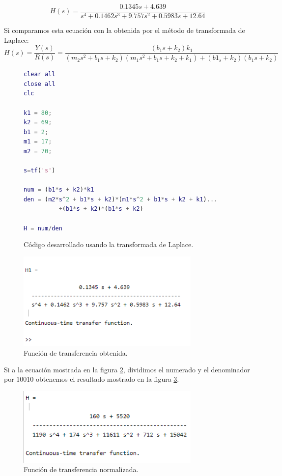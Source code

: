 \documentclass{article}
\begin{document}
\begin{enumerate}
\begin{equation*}
  H(s) = \frac{0.1345s + 4.639}{s^4+0.1462s^3+9.757s^2+0.5983s+12.64} 
\end{equation*}

Si comparamos esta ecuación con la obtenida por el método de transformada de Laplace:
\begin{equation*}
  H(s) = \frac{Y(s)}{R(s)} = \frac{(b_1s+k_2)k_1}{(m_2s^2+b_1s+k_2)(m_1s^2+b_1s+k_2+k_1)+(b1_s+k_2)(b_1s+k_2)}
\end{equation*}

\begin{figure}
\begin{lstlisting}[language=matlab]
clear all
close all
clc
 
k1 = 80;
k2 = 69;
b1 = 2;
m1 = 17;
m2 = 70;
 
s=tf('s')
 
num = (b1*s + k2)*k1
den = (m2*s^2 + b1*s + k2)*(m1*s^2 + b1*s + k2 + k1)...
          +(b1*s + k2)*(b1*s + k2)
 
H = num/den
\end{lstlisting}
\caption{Código desarrollado usando la transformada de Laplace.}
\label{fig:códigoLaplace}
\end{figure}

\begin{figure}
  \centering
  \includegraphics[width=9cm]{img/ecuacion.png}
  \caption{Función de transferencia obtenida.}
  \label{fig:ecuacion}
\end{figure}

Si a la ecuación mostrada en la figura \ref{fig:ecuacion}, dividimos el numerado y el denominador por 10010 obtenemos el resultado mostrado en la figura \ref{fig:ecuacion2}.

\begin{figure}
  \centering
  \includegraphics[width=9cm]{img/ecuacion2.png}
  \caption{Función de transferencia normalizada.}
  \label{fig:ecuacion2}
\end{figure}


\end{enumerate}
\end{document}
